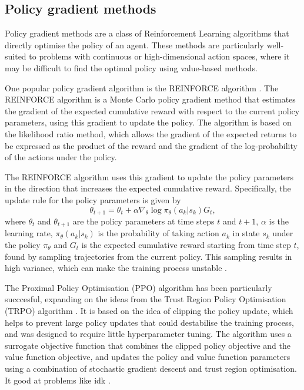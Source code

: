 \subsection{Policy gradient methods}
Policy gradient methods are a class of Reinforcement Learning algorithms that directly optimise the policy of an agent.
These methods are particularly well-suited to problems with continuous or high-dimensional action spaces, where it may be difficult to find the optimal policy using value-based methods.

One popular policy gradient algorithm is the REINFORCE algorithm \autocite{williams1992}.
The REINFORCE algorithm is a Monte Carlo policy gradient method that estimates the gradient of the expected cumulative reward with respect to the current policy parameters, using this gradient to update the policy.
The algorithm is based on the likelihood ratio method, which allows the gradient of the expected returns to be expressed as the product of the reward and the gradient of the log-probability of the actions under the policy.

The REINFORCE algorithm uses this gradient to update the policy parameters in the direction that increases the expected cumulative reward. Specifically, the update rule for the policy parameters is given by
\begin{equation}
    \theta_{t+1} = \theta_t + \alpha \nabla_{\theta} \log \pi_{\theta}(a_k|s_k) G_t,
\end{equation}
where $\theta_t$ and $\theta_{t+1}$ are the policy parameters at time steps $t$ and $t+1$, $\alpha$ is the learning rate, $\pi_{\theta}(a_k|s_k)$ is the probability of taking action $a_k$ in state $s_k$ under the policy $\pi_{\theta}$ and $G_t$ is the expected cumulative reward starting from time step $t$, found by sampling trajectories from the current policy.
This sampling results in high variance, which can make the training process unstable \autocite{arulkumaran2017}.

The Proximal Policy Optimisation (PPO) algorithm \autocite{schulman2017} has been particularly succcesful, expanding on the ideas from the Trust Region Policy Optimisation (TRPO) algorithm \autocite{schulman2015}.
It is based on the idea of clipping the policy update, which helps to prevent large policy updates that could destabilise the training process, and was designed to require little hyperparameter tuning.
The algorithm uses a surrogate objective function that combines the clipped policy objective and the value function objective, and updates the policy and value function parameters using a combination of stochastic gradient descent and trust region optimisation.
It good at problems like idk \autocite{NEEDED}.


